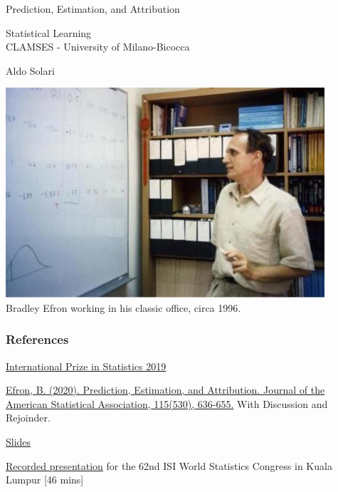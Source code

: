 \begin{frame}[fragile] \frametitle{}

\vfill

{\fontsize{0.7cm}{0cm}\selectfont Prediction, Estimation, and Attribution}\\
\vspace{0.5cm}

Statistical Learning\\
CLAMSES - University of Milano-Bicocca\\

\vspace{2cm}

\begin{minipage}{0.6\textwidth}
Aldo Solari
\end{minipage}

\end{frame}
\begin{frame}[fragile]

\centering 
\includegraphics[scale=1]{images/1996_Efron-office}\\
{\tiny Bradley Efron working in his classic office, circa 1996.}

\end{frame}
\begin{frame}[fragile]\frametitle{References}

\bi
\item \href{https://statprize.org/}{International Prize in Statistics 2019}
\item \href{https://www.fox.temple.edu/wp-content/uploads/2021/07/Efron-2020-JASA-wdiscussion.pdf}{Efron, B. (2020). Prediction, Estimation, and Attribution. Journal of the American Statistical Association, 115(530), 636-655.} With Discussion and Rejoinder.
\item \href{https://efron.ckirby.su.domains/talks/2019Predict-Estimat-Attribut.pdf}{Slides}
\item \href{https://drive.google.com/file/d/1uknyN7L8rIPCcyxGoXkMlVRE8lh5RFrm/view}{Recorded presentation} for the 62nd ISI World Statistics Congress in Kuala Lumpur [46 mins]
\ei

\end{frame}
